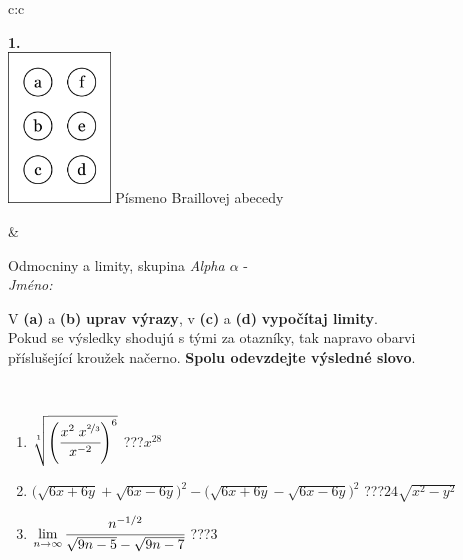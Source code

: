 \documentclass[10pt]{report}
\begin{document}
\begin{tabular}{c:c}
\begin{minipage}[c][104.5mm][t]{0.5\linewidth}
\begin{center}
\begin{minipage}{0.20\linewidth}
\begin{center}
{\Huge\bfseries 1.} \\[2mm]
\includegraphics[height=40mm]{../images/braille.png}
{\small Písmeno Braillovej abecedy}
\end{center}
\end{minipage}
\end{center}
\end{minipage}
&
\begin{minipage}[c][104.5mm][t]{0.5\linewidth}
\begin{center}
\vspace{7mm}
{\huge Odmocniny a limity, skupina \textit{Alpha $\alpha$} -}\\[5mm]
\textit{Jméno:}\phantom{xxxxxxxxxxxxxxxxxxxxxxxxxxxxxxxxxxxxxxxxxxxxxxxxxxxxxxxxxxxxxxxxx}\\[5mm]
\begin{minipage}{0.95\linewidth}
\begin{center}
V \textbf{(a)} a \textbf{(b)} \textbf{uprav výrazy}, v \textbf{(c)} a \textbf{(d)} \textbf{vypočítaj limity}.\\Pokud se výsledky shodujú s tými za otazníky, tak napravo obarvi\\příslušející kroužek načerno. \textbf{Spolu odevzdejte výsledné slovo}.
\end{center}
\end{minipage}
\\[1mm]
\begin{minipage}{0.79\linewidth}
\begin{center}
\begin{varwidth}{\linewidth}
\begin{enumerate}
\small
\item $\sqrt[1]{\left(\cfrac{x^{2}\;x^{\nicefrac{2}{3}}}{x^{-2}}\right)^{6}}$\quad \dotfill\; ???\;\dotfill \quad $x^{28}$
\item {\footnotesize{\scriptsize$\big(\sqrt{6x+6y}+\sqrt{6x-6y}\big)^2-\big(\sqrt{6x+6y}-\sqrt{6x-6y}\big)^2$}\quad \dotfill\; ???\;\dotfill \quad $24\sqrt{x^2-y^2}$}
\item $\lim\limits_{n\to\infty}\cfrac{n^{-1/2}}{\sqrt{9n-5}-\sqrt{9n-7}}$\quad \dotfill\; ???\;\dotfill \quad $3$

\end{enumerate}
\end{varwidth}
\end{center}
\end{minipage}
\end{center}
\end{minipage}
\end{tabular}
\end{document}
